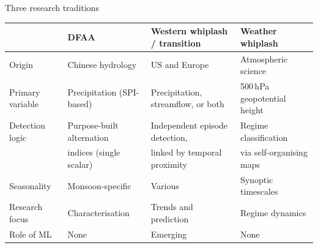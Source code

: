 \documentclass[aspectratio=169]{beamer}
\begin{document}
\begin{frame}{Three research traditions}

    \centering
    \vspace{-0.3em}

    \footnotesize
    \renewcommand{\arraystretch}{1.4}
    \begin{tabular}{l l l l}
    \toprule
     & \textbf{DFAA} & \textbf{Western whiplash / transition} & \textbf{Weather whiplash} \\
    \midrule
    Origin          & Chinese hydrology          & US and Europe                          & Atmospheric science \\
    Primary variable & Precipitation (SPI-based)  & Precipitation, streamflow, or both     & 500\,hPa geopotential height \\
    Detection logic  & Purpose-built alternation   & Independent episode detection,         & Regime classification \\
                     & indices (single scalar)     & linked by temporal proximity           & via self-organising maps \\
    Seasonality      & Monsoon-specific            & Various                                & Synoptic timescales \\
    Research focus   & Characterisation            & Trends and prediction                  & Regime dynamics \\
    Role of ML       & None                        & Emerging                               & None \\
    \bottomrule
    \end{tabular}

    \vspace{0.8em}
    \scriptsize

\end{frame}
\end{document}
